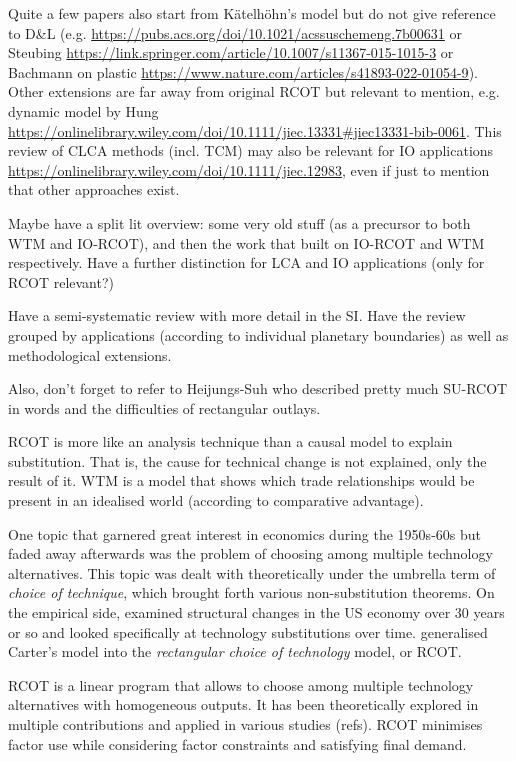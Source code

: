 \documentclass{article}
\begin{document}
\begin{refsection}
Quite a few papers also start from Kätelhöhn's model but do not give reference to D\&L (e.g. \url{https://pubs.acs.org/doi/10.1021/acssuschemeng.7b00631} or Steubing \url{https://link.springer.com/article/10.1007/s11367-015-1015-3} or Bachmann on plastic \url{https://www.nature.com/articles/s41893-022-01054-9}). Other extensions are far away from original RCOT but relevant to mention, e.g. dynamic model by Hung \url{https://onlinelibrary.wiley.com/doi/10.1111/jiec.13331#jiec13331-bib-0061}. This review of CLCA methods (incl. TCM) may also be relevant for IO applications \url{https://onlinelibrary.wiley.com/doi/10.1111/jiec.12983}, even if just to mention that other approaches exist.

Maybe have a split lit overview: some very old stuff (as a precursor to both WTM and IO-RCOT), and then the work that built on IO-RCOT and WTM respectively. Have a further distinction for LCA and IO applications (only for RCOT relevant?)

Have a semi-systematic review with more detail in the SI. Have the review grouped by applications (according to individual planetary boundaries) as well as methodological extensions.

Also, don't forget to refer to Heijungs-Suh who described pretty much SU-RCOT in words and the difficulties of rectangular outlays.

RCOT is more like an analysis technique than a causal model to explain substitution. That is, the cause for technical change is not explained, only the result of it.
WTM is a model that shows which trade relationships would be present in an idealised world (according to comparative advantage).

One topic that garnered great interest in economics during the 1950s-60s but faded away afterwards was the problem of choosing among multiple technology alternatives. This topic was dealt with theoretically under the umbrella term of \textit{choice of technique}, which brought forth various non-substitution theorems. On the empirical side, \textcite{carter1970} examined structural changes in the US economy over 30 years or so and looked specifically at technology substitutions over time. \textcite{duchin_2011} generalised Carter's model into the \textit{rectangular choice of technology} model, or RCOT.

RCOT is a linear program that allows to choose among multiple technology alternatives with homogeneous outputs. It has been theoretically explored in multiple contributions \parencite{duchin_2017,steenge_2019,duchin_2012} and applied in various studies (refs). RCOT minimises factor use while considering factor constraints and satisfying final demand.


\end{refsection}
\end{document}
